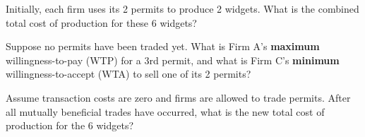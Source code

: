 \begin{subquestions}
    \item Initially, each firm uses its 2 permits to produce 2 widgets. What is the combined total cost of production for these 6 widgets?
    \item Suppose no permits have been traded yet. What is Firm A's \textbf{maximum} willingness-to-pay (WTP) for a 3rd permit, and what is Firm C's \textbf{minimum} willingness-to-accept (WTA) to sell one of its 2 permits?
    \item Assume transaction costs are zero and firms are allowed to trade permits. After all mutually beneficial trades have occurred, what is the new total cost of production for the 6 widgets?
\end{subquestions}